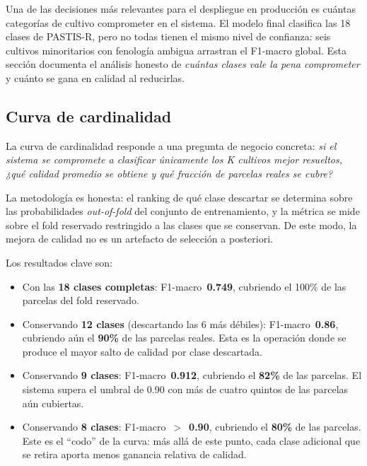 \documentclass{article}
\begin{document}
Una de las decisiones más relevantes para el despliegue en producción es
cuántas categorías de cultivo comprometer en el sistema. El modelo final
clasifica las 18 clases de PASTIS-R, pero no todas tienen el mismo nivel
de confianza: seis cultivos minoritarios con fenología ambigua arrastran
el F1-macro global. Esta sección documenta el análisis honesto de
\textit{cuántas clases vale la pena comprometer} y cuánto se gana en
calidad al reducirlas.

\subsection{Curva de cardinalidad}

La curva de cardinalidad responde a una pregunta de negocio concreta:
\textit{si el sistema se compromete a clasificar únicamente los K cultivos
mejor resueltos, ¿qué calidad promedio se obtiene y qué fracción de
parcelas reales se cubre?}

La metodología es honesta: el ranking de qué clase descartar se determina
sobre las probabilidades \textit{out-of-fold} del conjunto de entrenamiento,
y la métrica se mide sobre el fold reservado restringido a las clases que
se conservan. De este modo, la mejora de calidad no es un artefacto de
selección a posteriori.

Los resultados clave son:

\begin{itemize}[leftmargin=*]
    \item Con las \textbf{18 clases completas}: F1-macro~\textbf{0.749},
    cubriendo el 100\% de las parcelas del fold reservado.
    \item Conservando \textbf{12 clases} (descartando las 6 más débiles):
    F1-macro~\textbf{0.86}, cubriendo aún el \textbf{90\%} de las
    parcelas reales. Esta es la operación donde se produce el mayor salto
    de calidad por clase descartada.
    \item Conservando \textbf{9 clases}: F1-macro~\textbf{0.912},
    cubriendo el \textbf{82\%} de las parcelas. El sistema supera el
    umbral de 0.90 con más de cuatro quintos de las parcelas aún cubiertas.
    \item Conservando \textbf{8 clases}: F1-macro~$>$~\textbf{0.90},
    cubriendo el \textbf{80\%} de las parcelas. Este es el ``codo'' de la
    curva: más allá de este punto, cada clase adicional que se retira
    aporta menos ganancia relativa de calidad.
\end{itemize}
\end{document}
